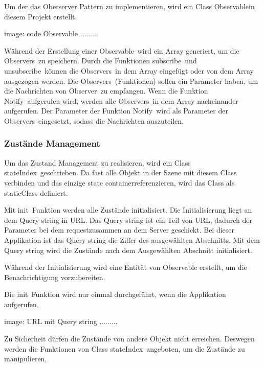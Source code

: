   Um der das Oberserver Pattern zu implementieren, wird ein Class \glqq Observable\grqq in diesem Projekt erstellt.
  
  image: code Observable .........
  
  Während der Erstellung einer \glqq Observable\grqq\ wird ein Array generiert, um die \glqq Observers\grqq\ zu speichern. Durch die Funktionen \glqq subscribe\grqq\ und \glqq unsubscribe\grqq\ können die \glqq Observers\grqq\ in dem Array eingefügt oder von dem Array ausgezogen werden. Die \glqq Observers\grqq\ (Funktionen) sollen ein Parameter haben, um die Nachrichten von \glqq Observer\grqq\ zu empfangen. Wenn die Funktion \glqq Notify\grqq\ aufgerufen wird, werden alle \glqq Observers\grqq\ in dem Array nacheinander aufgerufen. Der Parameter der Funktion \glqq Notify\grqq\ wird als Parameter der \glqq Observers\grqq\ eingesetzt, sodass die Nachrichten auszuteilen.
  
  \subsubsection{Zustände Management}
  
  Um das Zustand Management zu realisieren, wird ein Class \glqq stateIndex\grqq\ geschrieben. Da fast alle Objekt in der Szene mit diesem Class verbinden und das einzige \glqq state container\grqq referenzieren, wird das Class als \glqq static\grqq Class definiert.
  
  Mit \glqq init\grqq\ Funktion werden alle Zustände initialisiert. Die Initialisierung liegt an dem Query string in URL. Das Query string ist ein Teil von URL, dadurch der  Parameter bei dem \glqq request\grqq zusammen an dem Server geschickt. Bei dieser Applikation ist das Query string die Ziffer des ausgewählten Abschnitts. Mit dem Query string wird die Zustände nach dem Ausgewählten Abschnitt initialisiert.
  
  Während der Initialisierung wird eine Entität von Observable erstellt, um die Benachrichtigung vorzubereiten.
  
  Die \glqq init\grqq\ Funktion wird nur einmal durchgeführt, wenn die Applikation aufgerufen.
  
  image: URL mit Query string .........
  
  Zu Sicherheit dürfen die Zustände von andere Objekt nicht erreichen. Deswegen werden die Funktionen von Class \glqq stateIndex\grqq\ angeboten, um die Zustände zu manipulieren.
  
